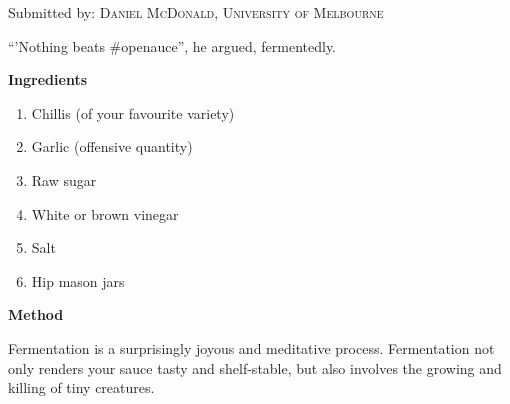 

Submitted by: \textsc{Daniel McDonald, University of Melbourne}


\begin{shadequote*}
``'Nothing beats \#openauce'', he argued, fermentedly.
\end{shadequote*}
\hrulefill

\textbf{Ingredients}

\begin{enumerate}[before=\itshape,font=\normalfont]
\item Chillis (of your favourite variety)
\item Garlic (offensive quantity)
\item Raw sugar
\item White or brown vinegar
\item Salt
\item Hip mason jars
\end{enumerate}

\hrulefill

\textbf{Method}

Fermentation is a surprisingly joyous and meditative process. Fermentation not only renders your sauce tasty and shelf-stable, but also involves the growing and killing of tiny creatures.


